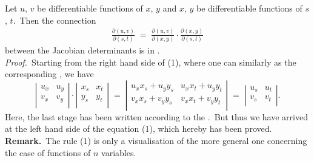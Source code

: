\documentclass[12pt]{article}
\theoremstyle{definition}
\begin{document}

Let $u$, $v$ be differentiable functions of $x$, $y$ and $x$, $y$ be differentiable functions of $s$, $t$.\, Then the connection
\begin{align}
\frac{\partial(u,v)}{\partial(s,t)} \;=\; \frac{\partial(u,v)}{\partial(x,y)}\cdot\frac{\partial(x,y)}{\partial(s,t)}
\end{align}
between the Jacobian determinants is in .\\

\emph{Proof.}\, Starting from the right hand side of (1), where one can  similarly as the corresponding , we have
$$\left|\begin{matrix}
u_x & u_y \\
v_x & v_y \\
\end{matrix}\right| \cdot
\left|\begin{matrix}
x_s & x_t \\
y_s & y_t \\
\end{matrix}\right| \;=\;
\left|\begin{matrix}
u_xx_s+u_yy_s & u_xx_t+u_yy_t \\
v_xx_s+v_yy_s & v_xx_t+v_yy_t \\
\end{matrix}\right| \;=\; 
\left|\begin{matrix}
u_s & u_t \\
v_s & v_t \\
\end{matrix}\right|. 
$$
Here, the last stage has been written according to the .\, But thus we have arrived at the left hand side of the equation (1), which hereby has been proved.\\

\textbf{Remark.}\, The rule (1) is only a visualisation of the more general one concerning the case of functions of $n$ variables.
\end{document}
